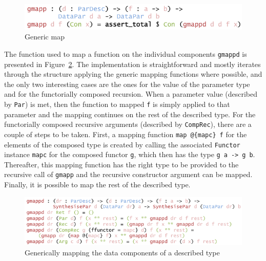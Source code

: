 \documentclass{ituthesis}
\newcommand{\ttconstructor}[1]{\textcolor{constructor-color}{\texttt{#1}}}
\newcommand{\ttdec}[1]{\textcolor{declared-var-color}{\texttt{#1}}}
\newcommand{\ttvar}[1]{\textcolor{local-var-color}{\texttt{#1}}}
\theoremstyle{break}
\begin{document}
\begin{figure}[ht]
\begin{center}
    \includegraphics[scale=0.5]{Figures/GenericMap.png}
\end{center}
\caption{Generic map}
\label{fig:mapgen}
\end{figure}

The function used to map a function on the individual components \ttdec{gmappd} is presented in Figure~\ref{fig:mapgendesc}.
The implementation is straightforward and mostly iterates through the structure applying the generic mapping functions where possible, and the only two interesting cases are the ones for the value of the parameter type
and for the functorially composed recursion.
When a parameter value (described by \ttconstructor{Par}) is met, then the function to mapped \ttvar{f} is simply applied to that parameter and the mapping continues on the rest of the described type.
For the functorially composed recursive arguments (described by \ttconstructor{CompRec}), there are a couple of steps to be taken.
First, a mapping function \ttdec{map}~\texttt{@\{}\ttvar{mapc}\texttt{\}}~\ttvar{f} for the elements of the composed type is created by calling the associated \ttvar{Functor} instance \ttvar{mapc} for the composed functor \ttvar{g}, which then has the type \ttvar{g}~\ttvar{a}~\texttt{->}~\ttvar{g}~\ttvar{b}.
Thereafter, this mapping function has the right type to be provided to the recursive call of \ttdec{gmapp} and the recursive constructor argument can be mapped.
Finally, it is possible to map the rest of the described type.

\begin{figure}[ht]
\begin{center}
    \includegraphics[scale=0.5]{Figures/GenericMapDesc.png}
\end{center}
\caption{Generically mapping the data components of a described type}
\label{fig:mapgendesc}
\end{figure}
\end{document}
